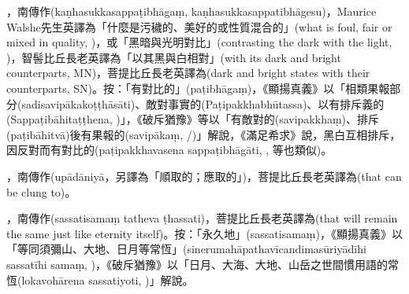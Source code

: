 \startitemgroup[noteitems]
\item{}，南傳作(kaṇhasukkasappaṭibhāgaṃ, kaṇhasukkasappatibhāgesu)，Maurice Walshe先生英譯為「什麼是污穢的、美好的或性質混合的」(what is foul, fair or mixed in quality, )，或「黑暗與光明對比」(contrasting the dark with the light, )，智髻比丘長老英譯為「以其黑與白相對」(with its dark and bright counterparts, MN)，菩提比丘長老英譯為(dark and bright states with their counterparts, SN)。按：「有對比的」(paṭibhāgaṃ)，《顯揚真義》以「相類果報部分(sadisavipākakoṭṭhāsāti)、敵對事實的(Paṭipakkhabhūtassa)、以有排斥義的(Sappaṭibāhitaṭṭhena, )」，《破斥猶豫》等以「有敵對的(savipakkhaṃ)、排斥(paṭibāhitvā)後有果報的(savipākaṃ, /)」解說，《滿足希求》說，黑白互相排斥，因反對而有對比的(paṭipakkhavasena sappaṭibhāgāti, , 等也類似)。
\stopitemgroup

\startitemgroup[noteitems]
\item{}，南傳作(upādāniyā，另譯為「順取的；應取的」)，菩提比丘長老英譯為(that can be clung to)。
\stopitemgroup

\startitemgroup[noteitems]
\item{}，南傳作(sassatisamaṃ tatheva ṭhassati)，菩提比丘長老英譯為(that will remain the same just like eternity itself)。按：「永久地」(sassatisamaṃ)，《顯揚真義》以「等同須彌山、大地、日月等常恆」(sinerumahāpathavīcandimasūriyādīhi sassatīhi samaṃ, )，《破斥猶豫》以「日月、大海、大地、山岳之世間慣用語的常恆(lokavohārena sassatiyoti, )」解說。
\stopitemgroup

